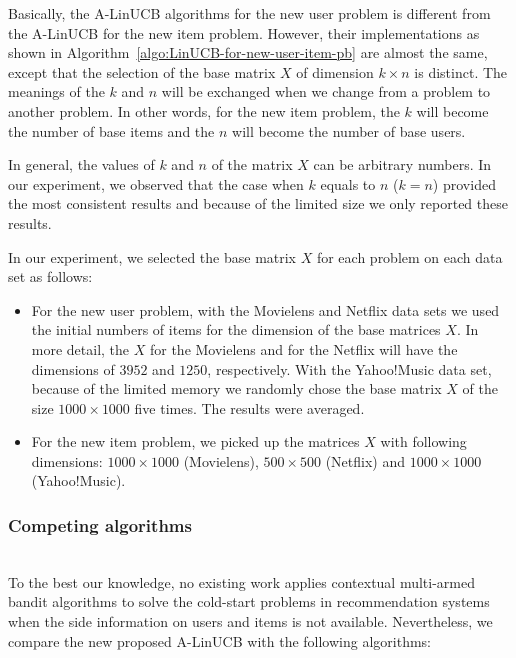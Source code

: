 \documentclass[twoside,leqno,twocolumn]{article}
\begin{document}
Basically, the A-LinUCB algorithms for the new user problem is different from the A-LinUCB for the new item problem. However, their implementations as shown in Algorithm~\ref{algo:LinUCB-for-new-user-item-pb} are almost the same, except that the selection of the base matrix $X$ of dimension $k\times n$ is distinct. The meanings of the $k$ and $n$ will be exchanged when we change from a problem to another problem. In other words, for the new item problem, the $k$ will become the number of base items and the $n$ will become the number of base users. 

In general, the values of $k$ and $n$ of the matrix $X$ can be arbitrary numbers. In our experiment, we observed that the case when $k$ equals to $n$ ($k=n$) provided the most consistent results and because of the limited size we only reported these results.

In our experiment, we selected the base matrix $X$ for each problem on each data set as follows:
\begin{itemize}
\item For the new user problem, with the Movielens and Netflix data sets we used the initial numbers of items for the dimension of the base matrices $X$. In more detail, the $X$ for the Movielens and for the Netflix will have the dimensions of $3952$ and $1250$, respectively. With the Yahoo!Music data set, because of the limited memory we randomly chose the base matrix $X$ of the size $1000\times 1000$ five times. The results were averaged.
 
\item For the new item problem, we picked up the matrices $X$ with following dimensions: $1000\times 1000$ (Movielens), $500\times 500$ (Netflix) and $1000\times 1000$ (Yahoo!Music).
\end{itemize} 

\subsubsection{Competing algorithms}
~\\
To the best our knowledge, no existing work applies contextual multi-armed bandit algorithms to solve the cold-start problems in recommendation systems when the side information on users and items is not available. Nevertheless, we compare the new proposed A-LinUCB with the following algorithms:
\end{document}
